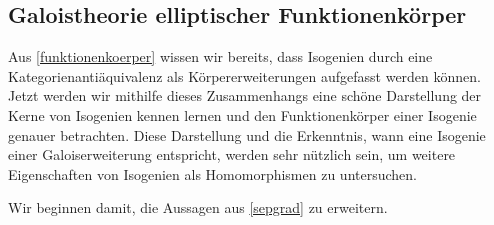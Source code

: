 \documentclass[english, german, parskip=half]{scrartcl}
\theoremstyle{definition}
\theoremstyle{remark}
\begin{document}

\subsection{Galoistheorie elliptischer Funktionenkörper}
Aus \autoref{funktionenkoerper} wissen wir bereits, dass Isogenien
durch eine Kategorienantiäquivalenz als Körpererweiterungen aufgefasst
werden können.
Jetzt werden wir mithilfe dieses Zusammenhangs eine schöne Darstellung
der Kerne von Isogenien kennen lernen und den Funktionenkörper einer
Isogenie genauer betrachten.
Diese Darstellung und die Erkenntnis, wann eine Isogenie einer
Galoiserweiterung entspricht, werden sehr nützlich sein, um weitere
Eigenschaften von Isogenien als Homomorphismen zu untersuchen.

Wir beginnen damit, die Aussagen aus \autoref{sepgrad} zu erweitern.
\end{document}
